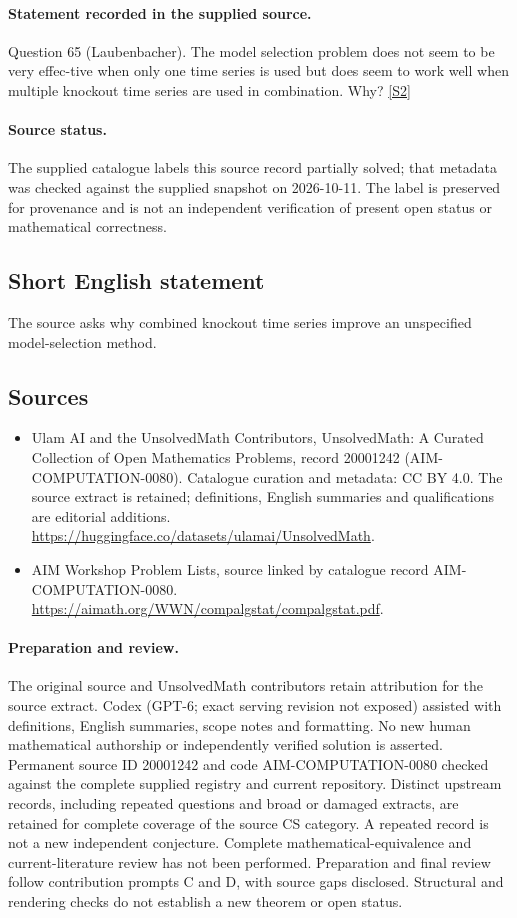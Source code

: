 \documentclass[11pt]{article}
\begin{document}
\paragraph{Statement recorded in the supplied source.}
Question 65 (Laubenbacher). The model selection problem does not seem to be very effec-tive when only one time series is used but does seem to work well when multiple knockout time series are used in combination. Why? \href{https://aimath.org/WWN/compalgstat/compalgstat.pdf}{[S2]}
\paragraph{Source status.}
The supplied catalogue labels this source record partially solved; that metadata was checked against the supplied snapshot on 2026-10-11. The label is preserved for provenance and is not an independent verification of present open status or mathematical correctness.
\subsection{Short English statement}
The source asks why combined knockout time series improve an unspecified model-selection method.
\subsection{Sources}
\begin{itemize}
\item[S1] Ulam AI and the UnsolvedMath Contributors, UnsolvedMath: A Curated Collection of Open Mathematics Problems, record 20001242 (AIM-COMPUTATION-0080). Catalogue curation and metadata: CC BY 4.0. The source extract is retained; definitions, English summaries and qualifications are editorial additions.
\url{https://huggingface.co/datasets/ulamai/UnsolvedMath}.
\item[S2] AIM Workshop Problem Lists, source linked by catalogue record AIM-COMPUTATION-0080.
\url{https://aimath.org/WWN/compalgstat/compalgstat.pdf}.
\end{itemize}
\paragraph{Preparation and review.}
The original source and UnsolvedMath contributors retain attribution for the source extract. Codex (GPT-6; exact serving revision not exposed) assisted with definitions, English summaries, scope notes and formatting. No new human mathematical authorship or independently verified solution is asserted. Permanent source ID 20001242 and code AIM-COMPUTATION-0080 checked against the complete supplied registry and current repository. Distinct upstream records, including repeated questions and broad or damaged extracts, are retained for complete coverage of the source CS category. A repeated record is not a new independent conjecture. Complete mathematical-equivalence and current-literature review has not been performed. Preparation and final review follow contribution prompts C and D, with source gaps disclosed. Structural and rendering checks do not establish a new theorem or open status.
\label{end:20001242}
\end{document}
